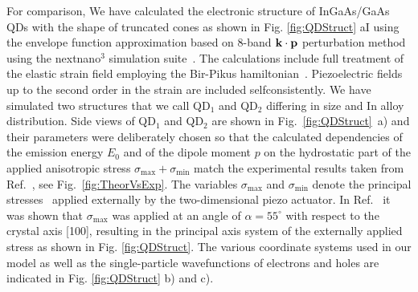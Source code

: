 \documentclass[aps,prl,amsmath,amssymb,twocolumn,showpacs,showkeys,superscriptaddress]{revtex4-1}
\begin{document}
For comparison, We have calculated the electronic structure of InGaAs/GaAs QDs with the shape of truncated cones as shown in Fig. \ref{fig:QDStruct} aI using the envelope function approximation based on 8-band ${\bf k}\cdot{\bf p}$ perturbation method using the nextnano$^3$ simulation suite~\cite{Birner:07}. The calculations include full treatment of the elastic strain field employing the Bir-Pikus hamiltonian~\cite{Bir:74}. Piezoelectric fields up to the second order in the strain are included selfconsistently.  We have simulated two structures that we call QD$_1$ and QD$_2$ differing in size and In alloy distribution.
Side views of QD$_1$ and QD$_2$ are shown in Fig.~\ref{fig:QDStruct}~a) and their parameters were deliberately chosen so that the calculated dependencies of the emission energy $E_0$ and of the dipole moment $p$ on the hydrostatic part of the applied anisotropic stress $\sigma_{\mathrm{max}}+\sigma_{\mathrm{min}}$ match the experimental results taken from Ref.~\cite{Aberl:17}, see Fig.~\ref{fig:TheorVsExp}. The variables $\sigma_{\mathrm{max}}$ and $\sigma_{\mathrm{min}}$ denote the principal stresses~\cite{Trotta:15} applied externally by the two-dimensional piezo actuator. In  Ref.~\citep{Aberl:17} it was shown that $\sigma_{\mathrm{max}}$ was applied at an angle of $\alpha=55^{\circ}$ with respect to the crystal axis [100], resulting in the principal axis system of the externally applied stress as shown in   Fig. \ref{fig:QDStruct}. The various coordinate systems used in our model as well as the single-particle wavefunctions of electrons and holes are indicated in Fig. \ref{fig:QDStruct} b) and c).
%
%
%
\end{document}
